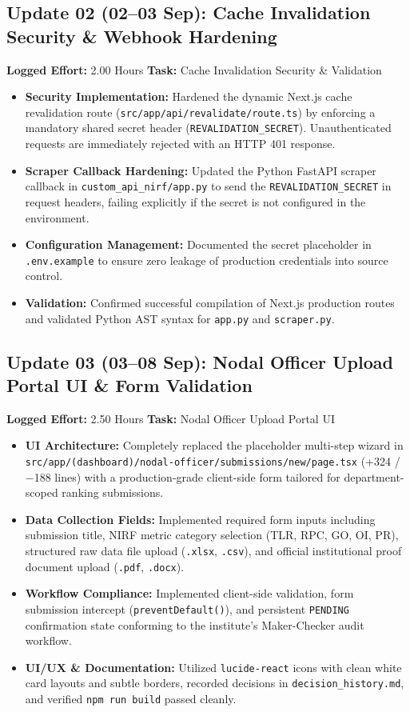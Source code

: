 \documentclass[11pt,a4paper]{article}
\begin{document}
\subsection*{Update 02 (02--03 Sep): Cache Invalidation Security \& Webhook Hardening}
\textbf{Logged Effort:} 2.00 Hours \quad \textbf{Task:} Cache Invalidation Security \& Validation
\begin{itemize}[leftmargin=1.4em, itemsep=2pt]
\item \textbf{Security Implementation:} Hardened the dynamic Next.js cache revalidation route (\texttt{src/app/api/revalidate/route.ts}) by enforcing a mandatory shared secret header (\texttt{REVALIDATION\_SECRET}). Unauthenticated requests are immediately rejected with an HTTP 401 response.
\item \textbf{Scraper Callback Hardening:} Updated the Python FastAPI scraper callback in \texttt{custom\_api\_nirf/app.py} to send the \texttt{REVALIDATION\_SECRET} in request headers, failing explicitly if the secret is not configured in the environment.
\item \textbf{Configuration Management:} Documented the secret placeholder in \texttt{.env.example} to ensure zero leakage of production credentials into source control.
\item \textbf{Validation:} Confirmed successful compilation of Next.js production routes and validated Python AST syntax for \texttt{app.py} and \texttt{scraper.py}.
\end{itemize}

\subsection*{Update 03 (03--08 Sep): Nodal Officer Upload Portal UI \& Form Validation}
\textbf{Logged Effort:} 2.50 Hours \quad \textbf{Task:} Nodal Officer Upload Portal UI
\begin{itemize}[leftmargin=1.4em, itemsep=2pt]
\item \textbf{UI Architecture:} Completely replaced the placeholder multi-step wizard in \texttt{src/app/(dashboard)/nodal-officer/submissions/new/page.tsx} (+324 / $-$188 lines) with a production-grade client-side form tailored for department-scoped ranking submissions.
\item \textbf{Data Collection Fields:} Implemented required form inputs including submission title, NIRF metric category selection (TLR, RPC, GO, OI, PR), structured raw data file upload (\texttt{.xlsx}, \texttt{.csv}), and official institutional proof document upload (\texttt{.pdf}, \texttt{.docx}).
\item \textbf{Workflow Compliance:} Implemented client-side validation, form submission intercept (\texttt{preventDefault()}), and persistent \texttt{PENDING} confirmation state conforming to the institute's Maker-Checker audit workflow.
\item \textbf{UI/UX \& Documentation:} Utilized \texttt{lucide-react} icons with clean white card layouts and subtle borders, recorded decisions in \texttt{decision\_history.md}, and verified \texttt{npm run build} passed cleanly.
\end{itemize}
\end{document}
